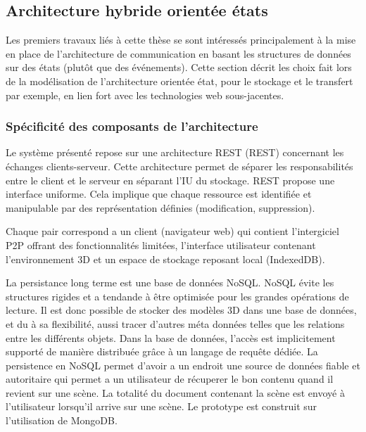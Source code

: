\subsection{Architecture hybride \og orientée états\fg{}}
\label{sec:comm_state}

Les premiers travaux liés à cette thèse \cite{Desprat2015a,Desprat2015b} se sont 
intéressés principalement à la mise en place de l'architecture de communication 
en basant les structures de données sur des états (plutôt que des événements). 
Cette section décrit les choix fait lors de la modélisation de l'architecture \og 
orientée état\fg{}, pour le stockage et le transfert par exemple, en lien fort avec les 
technologies web sous-jacentes.  
%
%
%
%
%  
\subsubsection{Spécificité des composants de l'architecture}
Le système présenté repose sur une architecture \acrshort{REST} 
(\acrlong{REST}) concernant les échanges clients-serveur. Cette architecture 
permet de séparer les responsabilités entre le client et le serveur en séparant 
l'\gls{IU} du stockage. \gls{REST} propose une interface uniforme. Cela implique 
que chaque ressource est identifiée et manipulable par des représentation définies 
(modification, suppression). 

Chaque pair correspond a un client (navigateur web) qui contient l'intergiciel 
\gls{P2P} offrant des fonctionnalités limitées, l'interface utilisateur contenant 
l'environnement 3D et un espace de stockage reposant local (IndexedDB).

La persistance long terme est une base de données NoSQL.
NoSQL évite les structures rigides et a tendande à être optimisée pour les grandes 
opérations de lecture. Il est donc possible de stocker des modèles 3D dans une 
base de données, et du à sa flexibilité, aussi tracer d'autres méta données telles 
que les relations entre les différents objets. Dans la base de données, l'accès est 
implicitement supporté de manière distribuée grâce à un langage de requête 
dédiée. La persistence en NoSQL permet d'avoir a un endroit une source de 
données fiable et autoritaire qui permet a un utilisateur de récuperer le bon contenu 
quand il revient sur une scène. La totalité du document contenant la scène est 
envoyé à l'utilisateur lorsqu'il arrive sur une scène.
Le prototype est construit sur l'utilisation de MongoDB.


